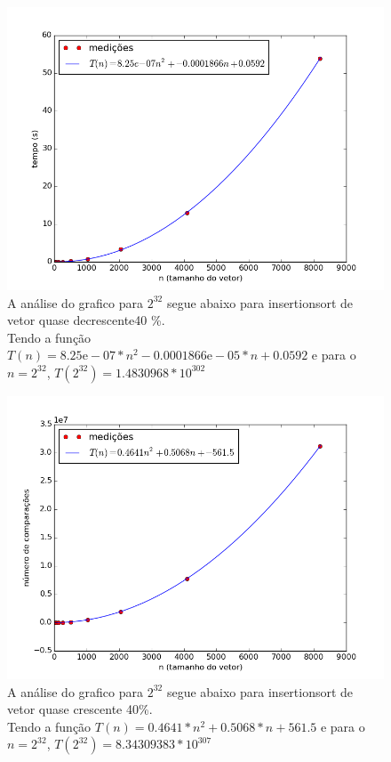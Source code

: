 \documentclass[12pt,a4paper,twoside]{report}
\begin{document}


\begin{figure}[ht]
\centering \includegraphics[scale=0.8]{../insertionsort/imagens/insertionsortQuaseDecresc400.png}
\caption{A análise do grafico para $2^{32}$ segue abaixo para insertionsort de vetor quase decrescente40 \%.\\
Tendo a função $T(n) = 8.25\mathrm{e}-07*n^2-0.0001866\mathrm{e}-05*n+0.0592$ e para o $n =2^{32}$, $T(2^{32}) = 1.4830968 * 10^{302}$}
\label{fig:insertionsortQuaseDecresc400}
\end{figure}

\begin{figure}[ht]
\centering \includegraphics[scale=0.8]{../insertionsort/imagens/insertionsortQuaseDecresc401.png}
\caption{A análise do grafico para $2^{32}$ segue abaixo para insertionsort de vetor quase crescente 40\%.\\
Tendo a função $T(n) = 0.4641*n^2+0.5068*n+561.5$ e para o $n =2^{32}$, $T(2^{32}) = 8.34309383 * 10^{307}$}
\label{fig:insertionsortQuaseDecresc401}
\end{figure}
\end{document}
